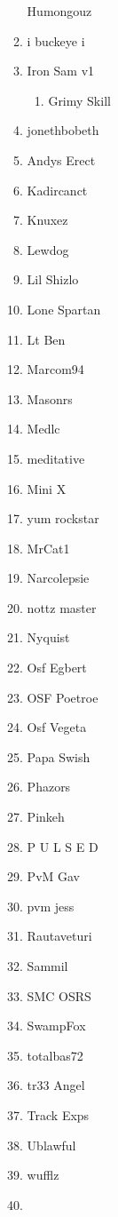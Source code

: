 \documentclass{article}
\begin{document}
\begin{enumerate}[I]
\begin{enumerate}[I]
	Humongouz
      \item
	i buckeye i
      \item
	Iron Sam v1
	  \begin{enumerate}[I]
	    \item
	      Grimy Skill
	  \end{enumerate}
      \item
	jonethbobeth
      \item
	Andys Erect
      \item
	Kadircanct
      \item
	Knuxez
      \item
	Lewdog
      \item
	Lil Shizlo
      \item
	Lone Spartan
      \item
	Lt Ben
      \item
	Marcom94
      \item
	Masonrs
      \item
	Medlc
      \item
	meditative
      \item
	Mini X
      \item
	yum rockstar
      \item
	MrCat1
      \item
	Narcolepsie
      \item
	nottz master
      \item
	Nyquist
      \item
	Osf Egbert
      \item
	OSF Poetroe
      \item
	Osf Vegeta
      \item
	Papa Swish
      \item
	Phazors
      \item
	Pinkeh
      \item
	P U L S E D
      \item
	PvM Gav
      \item
	pvm jess
      \item
	Rautaveturi
      \item
	Sammil
      \item
	SMC OSRS
      \item
	SwampFox
      \item
	totalbas72
      \item
	tr33 Angel
      \item
	Track Exps
      \item
	Ublawful
      \item
	wufflz
      \item

\end{enumerate}
\end{enumerate}
\end{document}
